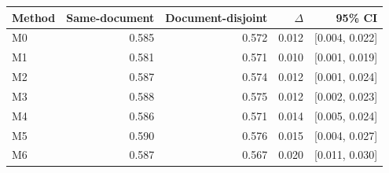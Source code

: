 \begin{tabular}{lrrrr}
\toprule
Method & Same-document & Document-disjoint & $\Delta$ & 95\% CI \\
\midrule
M0 & 0.585 & 0.572 & 0.012 & [0.004, 0.022] \\
M1 & 0.581 & 0.571 & 0.010 & [0.001, 0.019] \\
M2 & 0.587 & 0.574 & 0.012 & [0.001, 0.024] \\
M3 & 0.588 & 0.575 & 0.012 & [0.002, 0.023] \\
M4 & 0.586 & 0.571 & 0.014 & [0.005, 0.024] \\
M5 & 0.590 & 0.576 & 0.015 & [0.004, 0.027] \\
M6 & 0.587 & 0.567 & 0.020 & [0.011, 0.030] \\
\bottomrule
\end{tabular}
